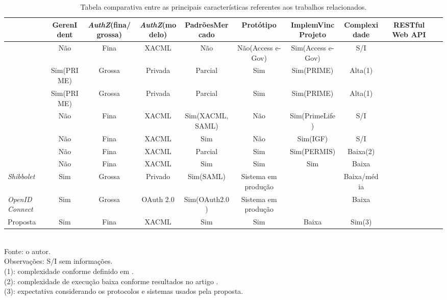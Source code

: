 \documentclass{doublecol-new}
\begin{document}
\begin{table}
	\tiny
	\centering
	\caption{Tabela comparativa entre as principais características referentes aos trabalhos relacionados.}
	\label{tab-tabela-comparativa}
	\begin{tabular}{|m{6em}|c|c|c|c|c|c|c|c|c|}
		\hline  & GerenIdent & \textit{AuthZ}(fina/grossa) & \textit{AuthZ}(modelo) & PadrõesMercado & Protótipo & ImplemVincProjeto & Complexidade & RESTful Web API\\ 
		\hline \cite{kolter2007privacy}     & Não        & Fina   & XACML           & Não            & Não(Access e-Gov) & Sim(Access e-Gov) & S/I \\ 
		\hline \cite{ardagna2008privacy}    & Sim(PRIME) & Grossa & Privada         & Parcial        & Sim               & Sim(PRIME)        & Alta(1) \\ 
		\hline \cite{ardagna2010exploiting} & Sim(PRIME) & Grossa & Privada         & Parcial        & Sim               & Sim(PRIME)        & Alta(1) \\ 
		\hline \cite{ardagna2010enabling}   & Não        & Fina   & XACML           & Sim(XACML,SAML)  & Não               & Sim(PrimeLife)    & S/I \\ 
		\hline \cite{kounga2010extending}   & Não        & Fina   & XACML           & Sim            & Não               & Sim(IGF)          & S/I \\ 
		\hline \cite{chadwick2012privacy}   & Não        & Fina   & XACML           & Parcial        & Sim               & Sim(PERMIS)       & Baixa(2) \\ 
		\hline \cite{ma2015cloud}           & Não        & Fina   & XACML           & Sim            & Sim               & Sim               & Baixa \\ 
		\hline \textit{Shibbolet}           & Sim        & Grossa & Privado         & Sim(SAML)      & Sistema em produção & \-     & Baixa/média \\
		\hline \textit{OpenID Connect}      & Sim        & Grossa & OAuth 2.0       & Sim(OAuth2.0)  & Sistema em produção & \-     & Baixa \\    
		\hline Proposta                     & Sim        & Fina   & XACML           & Sim            & Sim               & Baixa             & Sim(3) \\
		\hline 
	\end{tabular} 
	\\ Fonte: o autor.
	\\ Observações: S/I sem informações.
	\\ (1): complexidade conforme definido em \cite{nogueira2014aprimoramento}.
	\\ (2): complexidade de execução baixa conforme resultados no artigo \cite{chadwick2012privacy}.
	\\ (3): expectativa considerando os protocolos e sistemas usados pela proposta.
\end{table}
\end{document}
